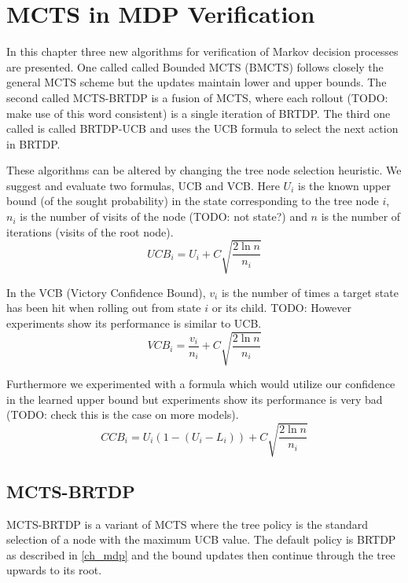 \chapter{MCTS in MDP Verification}

In this chapter three new algorithms for verification of Markov
decision processes are presented. One called
called Bounded MCTS (BMCTS) follows closely the general MCTS scheme
but the updates maintain lower and upper bounds. The second called
MCTS-BRTDP is a fusion of MCTS, where each rollout (TODO: make use of
this word consistent) is a single iteration of BRTDP.
The third one called is called BRTDP-UCB and uses the UCB formula to
select the next action in BRTDP.

These algorithms can be altered by changing the tree node selection
heuristic. We suggest and evaluate two formulas, UCB and VCB. Here $U_i$
is the known upper bound (of the sought probability) in the state
corresponding to the tree node $i$, $n_i$ is the number of visits of the
node (TODO: not state?) and $n$ is the number of iterations (visits of
the root node).
\begin{equation*}
    UCB_i = U_i + C \sqrt{ \frac{2 \ln n}{n_i} }
\end{equation*}

In the VCB (Victory Confidence Bound), $v_i$ is the number of times a
target state has been hit when rolling out from state $i$ or its child.
TODO: However experiments show its performance is similar to UCB.
\[
    VCB_i = \frac{v_i}{n_i} + C \sqrt{ \frac{2 \ln n}{n_i} }
\]

Furthermore we experimented with a formula which would utilize our
confidence in the learned upper bound but experiments show its
performance is very bad (TODO: check this is the case on more models).
\[
    CCB_i = U_i (1 - (U_i - L_i)) + C \sqrt{ \frac{2 \ln n}{n_i} }
\]


\section{MCTS-BRTDP}

MCTS-BRTDP is a variant of MCTS where the tree policy is the standard
selection of a node with the maximum UCB value. The default policy is
BRTDP as described in \autoref{ch_mdp} and the bound updates then continue
through the tree upwards to its root.

